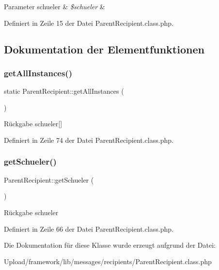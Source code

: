 \begin{DoxyParams}[1]{Parameter}
schueler & {\em \$schueler} & \\
\hline
\end{DoxyParams}


Definiert in Zeile 15 der Datei Parent\+Recipient.\+class.\+php.



\subsection{Dokumentation der Elementfunktionen}
\mbox{\label{class_parent_recipient_a92d0bbe902b987627dde3ef7601168dd}} 
\subsubsection{\texorpdfstring{get\+All\+Instances()}{getAllInstances()}}
{\footnotesize\ttfamily static Parent\+Recipient\+::get\+All\+Instances (\begin{DoxyParamCaption}{ }\end{DoxyParamCaption})\hspace{0.3cm}{\ttfamily [static]}}

\begin{DoxyReturn}{Rückgabe}
schueler\mbox{[}\mbox{]} 
\end{DoxyReturn}


Definiert in Zeile 74 der Datei Parent\+Recipient.\+class.\+php.

\mbox{\label{class_parent_recipient_a1ed2846e95f8b119cfe8c75862e71c9a}} 
\subsubsection{\texorpdfstring{get\+Schueler()}{getSchueler()}}
{\footnotesize\ttfamily Parent\+Recipient\+::get\+Schueler (\begin{DoxyParamCaption}{ }\end{DoxyParamCaption})}

\begin{DoxyReturn}{Rückgabe}
schueler 
\end{DoxyReturn}


Definiert in Zeile 66 der Datei Parent\+Recipient.\+class.\+php.



Die Dokumentation für diese Klasse wurde erzeugt aufgrund der Datei\+:\begin{DoxyCompactItemize}
\item 
Upload/framework/lib/messages/recipients/Parent\+Recipient.\+class.\+php\end{DoxyCompactItemize}
